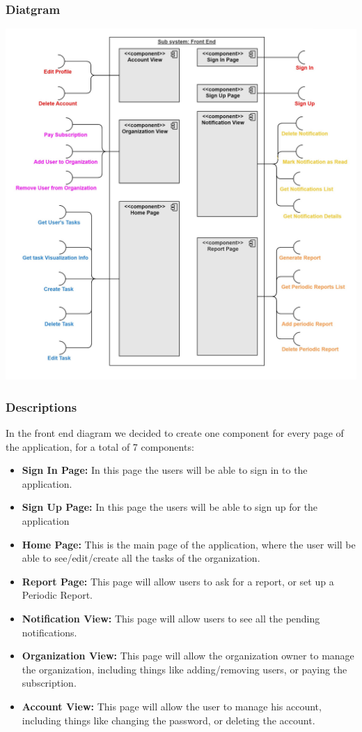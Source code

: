\documentclass{article}
\begin{document}
\subsubsection{Diatgram}
\includegraphics[width=\textwidth,height=\textheight,keepaspectratio]{images/component_diagram/front_end.jpg}
\subsubsection{Descriptions}
In the front end diagram we decided to create one component for every page of the application, for a total of 7 components:
\begin{itemize}
    \item \textbf{Sign In Page: } In this page the users will be able to sign in to the application.
    \item \textbf{Sign Up Page: } In this page the users will be able to sign up for the application
    \item \textbf{Home Page: } This is the main page of the application, where the user will be able to see/edit/create all the tasks of the organization.
    \item \textbf{Report Page: } This page will allow users to ask for a report, or set up a Periodic Report.
    \item \textbf{Notification View: } This page will allow users to see all the pending notifications.
    \item \textbf{Organization View: } This page will allow the organization owner to manage the organization, including things like adding/removing users, or paying the subscription.
    \item \textbf{Account View: } This page will allow the user to manage his account, including things like changing the password, or deleting the account.
\end{itemize}
\end{document}
